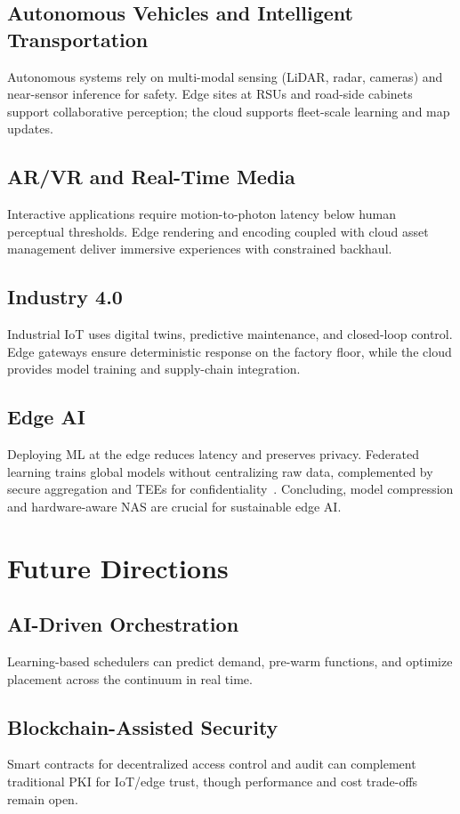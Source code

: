 \documentclass[conference]{IEEEtran}
\begin{document}
\subsection{Autonomous Vehicles and Intelligent Transportation}
Autonomous systems rely on multi-modal sensing (LiDAR, radar, cameras) and near-sensor inference for safety. Edge sites at RSUs and road-side cabinets support collaborative perception; the cloud supports fleet-scale learning and map updates.

\subsection{AR/VR and Real-Time Media}
Interactive applications require motion-to-photon latency below human perceptual thresholds. Edge rendering and encoding coupled with cloud asset management deliver immersive experiences with constrained backhaul.

\subsection{Industry 4.0}
Industrial IoT uses digital twins, predictive maintenance, and closed-loop control. Edge gateways ensure deterministic response on the factory floor, while the cloud provides model training and supply-chain integration.

\subsection{Edge AI}
Deploying ML at the edge reduces latency and preserves privacy. Federated learning trains global models without centralizing raw data, complemented by secure aggregation and TEEs for confidentiality~\cite{McMahan2017FL,Bonawitz2017SA,Schuster2015VC3}. Concluding, model compression and hardware-aware NAS are crucial for sustainable edge AI.

\section{Future Directions}\label{sec:future}
\subsection{AI-Driven Orchestration}
Learning-based schedulers can predict demand, pre-warm functions, and optimize placement across the continuum in real time.

\subsection{Blockchain-Assisted Security}
Smart contracts for decentralized access control and audit can complement traditional PKI for IoT/edge trust, though performance and cost trade-offs remain open.
\end{document}
